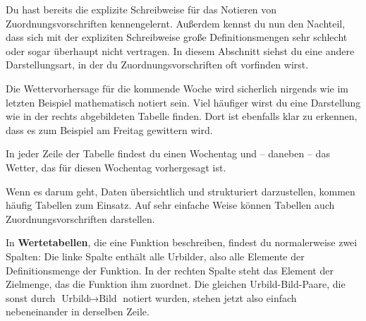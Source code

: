 \documentclass[../../main.tex]{subfiles}
\begin{document}
Du hast bereits die explizite Schreibweise für das Notieren von Zuordnungsvorschriften kennengelernt. Außerdem kennst du nun den Nachteil, dass sich mit der expliziten Schreibweise große Definitionsmengen sehr schlecht oder sogar überhaupt nicht vertragen. In diesem Abschnitt siehst du eine andere Darstellungsart, in der du Zuordnungsvorschriften oft vorfinden wirst.

\begin{example}{}
    
    Die Wettervorhersage für die kommende Woche wird sicherlich nirgends wie im letzten Beispiel mathematisch notiert sein. Viel häufiger wirst du eine Darstellung wie in der rechts abgebildeten Tabelle finden. Dort ist ebenfalls klar zu erkennen, dass es zum Beispiel am Freitag gewittern wird.
    
    In jeder Zeile der Tabelle findest du einen Wochentag und -- daneben -- das Wetter, das für diesen Wochentag vorhergesagt ist.
\end{example}

Wenn es darum geht, Daten übersichtlich und strukturiert darzustellen, kommen häufig Tabellen zum Einsatz. Auf sehr einfache Weise können Tabellen auch Zuordnungsvorschriften darstellen.

In \textbf{Wertetabellen}, die eine Funktion beschreiben, findest du normalerweise zwei Spalten: Die linke Spalte enthält alle Urbilder, also alle Elemente der Definitionsmenge der Funktion. In der rechten Spalte steht das Element der Zielmenge, das die Funktion ihm zuordnet. Die gleichen Urbild-Bild-Paare, die sonst durch $\text{Urbild}\mapsto\text{Bild}$ notiert wurden, stehen jetzt also einfach nebeneinander in derselben Zeile.

\end{document}
